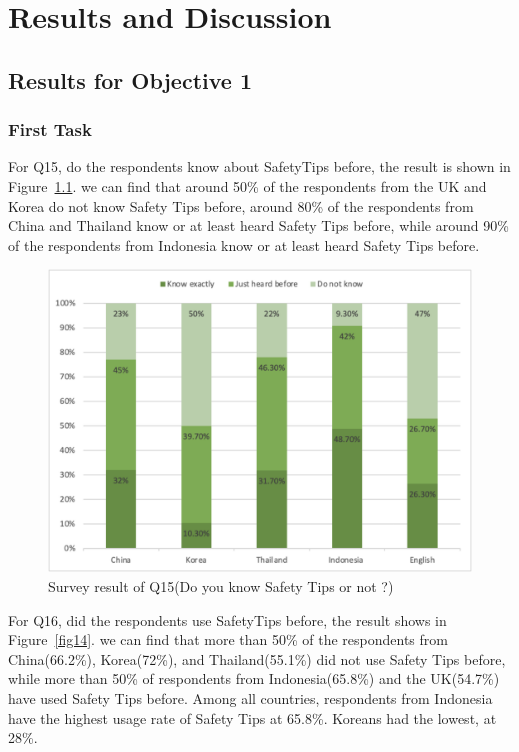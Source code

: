 \chapter{Results and Discussion}
\label{c5}

\section{Results for Objective 1 }
\subsection{First Task}
For Q15, do the respondents know about SafetyTips before, the result is shown in Figure~\ref{fig13}. we can find that around 50\% of the respondents from the UK and Korea do not know Safety Tips before, around 80\% of the respondents from China and Thailand know or at least heard Safety Tips before, while around 90\% of the respondents from Indonesia know or at least heard Safety Tips before. 

\begin{figure}[h]
  \includegraphics[width=0.8\linewidth]{Figure/Figure13.jpg}
  \centering
  \caption[Survey result of Q15]{Survey result of Q15(Do you know Safety Tips or not ?)}
  \label{fig13}
\end{figure}

For Q16, did the respondents use SafetyTips before, the result shows in Figure~\ref{fig14}. we can find that more than 50\% of the respondents from China(66.2\%), Korea(72\%), and Thailand(55.1\%) did not use Safety Tips before, while more than 50\% of respondents from Indonesia(65.8\%) and the UK(54.7\%) have used Safety Tips before. Among all countries, respondents from Indonesia have the highest usage rate of Safety Tips at 65.8\%. Koreans had the lowest, at 28\%. 

